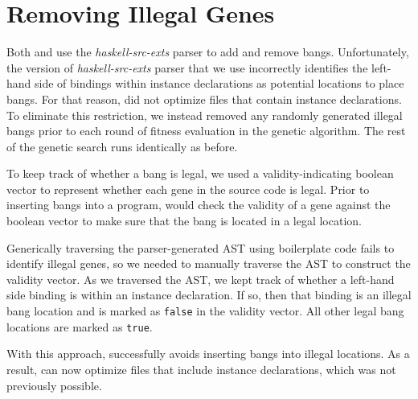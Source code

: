 
\section{Removing Illegal Genes}

Both \Ao{} and \At{} use the \textit{haskell-src-exts} parser to add
and remove bangs.
Unfortunately, the version of \textit{haskell-src-exts} parser that we use
incorrectly identifies the left-hand side of bindings within instance
declarations as potential locations to place bangs. For that reason,
\Ao{} did not optimize files that contain instance declarations.
To eliminate this restriction, we instead removed any randomly
generated illegal bangs prior to each round of fitness evaluation in
the genetic algorithm. The rest of the genetic search runs
identically as before.

To keep track of whether a bang is legal, we used a
validity-indicating boolean vector to represent whether each gene in
the source code is legal. Prior to inserting bangs into a
program, \At{} would check the validity of a gene against the boolean
vector to make sure that the bang is located in a legal location.

Generically traversing the parser-generated AST using boilerplate code
fails to identify illegal genes, so we needed to manually traverse the AST
to construct the validity vector. As we traversed the AST, we kept
track of whether a left-hand side binding is within an instance
declaration. If so, then that binding is an illegal bang location and
is marked as \texttt{false} in the validity vector. All other
legal bang locations are marked as  \texttt{true}.

With this approach, \At{} successfully avoids inserting bangs into
illegal locations.  As a result, \At{} can now optimize files that
include instance declarations, which was not previously possible.
